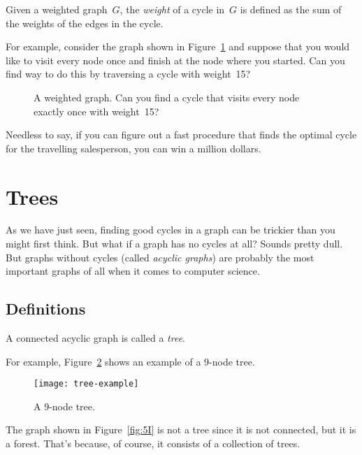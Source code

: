 \begin{definition}
Given a weighted graph~$G$, the \emph{weight} of a cycle in~$G$ is
defined as the sum of the weights of the edges in the cycle.
\end{definition}

For example, consider the graph shown in Figure~\ref{fig:5AL} and
suppose that you would like to visit every node once and finish at the
node where you started.  Can you find  way to do this by traversing a
cycle with weight~15?

\begin{figure}
\missinggraphic

\caption{A weighted graph.  Can you find a cycle that visits every
  node exactly once with weight~15?}

\label{fig:5AL}
\end{figure}

Needless to say, if you can figure out a fast procedure that finds the
optimal cycle for the travelling salesperson, you can win a million
dollars.

\section{Trees}\label{trees-sec}

As we have just seen, finding good cycles in a graph can be trickier
than you might first think.  But what if a graph has no cycles at all?
Sounds pretty dull.  But graphs without cycles (called \emph{acyclic
  graphs}) are probably the most important graphs of all when it comes
to computer science.

\subsection{Definitions}

\begin{definition}\label{def:tree}
A connected acyclic graph is called a \emph{tree}.
\end{definition}

For example, Figure~\ref{fig:5H} shows an example of a 9-node tree.

\begin{figure}[h]

\texttt{[image: tree-example]}

\caption{A 9-node tree.}
\label{fig:5H}
\end{figure}

The graph shown in Figure~\ref{fig:5I} is not a tree since it is not
connected, but it is a forest.  That's because, of course, it consists
of a collection of trees.

